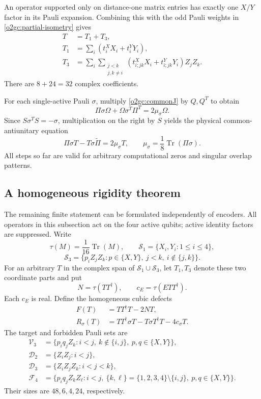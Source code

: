 \documentclass[11pt]{article}
\theoremstyle{definition}
\begin{document}
An operator supported only on distance-one matrix entries has exactly
one \(X/Y\) factor in its Pauli expansion. Combining this with the odd
Pauli weights in \eqref{o2gc:partial-isometry} gives
\begin{align}
 T&=T_1+T_3,\label{o2gc:T-support}\\
 T_1&=\sum_i(t_i^XX_i+t_i^YY_i),\nonumber\\
 T_3&=\sum_i\sum_{\substack{j<k\\j,k\ne i}}
          (t_{i;jk}^XX_i+t_{i;jk}^YY_i)Z_jZ_k.\nonumber
\end{align}
There are \(8+24=32\) complex coefficients.

For each single-active Pauli \(\sigma\), multiply
\eqref{o2gc:commonJ} by \(Q,Q^T\) to obtain
\[
 \Pi\sigma\Omega+\Omega\sigma^T\Pi^T=2\mu_\sigma\Omega.
\]
Since \(S\sigma^TS=-\sigma\), multiplication on the right by \(S\)
yields the physical common-antiunitary equation
\begin{equation}
 \Pi\sigma T-T\sigma\widetilde\Pi=2\mu_\sigma T,\qquad
 \mu_\sigma=\frac18\operatorname{Tr}(\Pi\sigma).
 \label{o2gc:physical-J}
\end{equation}
All steps so far are valid for arbitrary computational zeros and
singular overlap patterns.

\subsection{A homogeneous rigidity theorem}
\label{o2gc:subsec-rigidity}

The remaining finite statement can be formulated independently of
encoders. All operators in this subsection act on the four active
qubits; active identity factors are suppressed. Write
\[
 \tau(M)=\frac1{16}\operatorname{Tr}(M),\qquad
 \mathcal S_1=\{X_i,Y_i:1\le i\le4\},
\]
\[
 \mathcal S_3=\{p_iZ_jZ_k:p\in\{X,Y\},\ j<k,\ i\notin\{j,k\}\}.
\]
For an arbitrary \(T\) in the complex span of
\(\mathcal S_1\cup\mathcal S_3\), let \(T_1,T_3\) denote these two
coordinate parts and put
\begin{equation}
 N=\tau(TT^\dagger),\qquad c_E=\tau(ETT^\dagger).
 \label{o2gc:homogeneous-scalars}
\end{equation}
Each \(c_E\) is real. Define the homogeneous cubic defects
\begin{align}
 F(T)&=TT^\dagger T-2NT,\label{o2gc:defects}\\
 R_\sigma(T)&=TT^\dagger\sigma T-T\sigma T^\dagger T-4c_\sigma T.
 \nonumber
\end{align}
The target and forbidden Pauli sets are
\begin{align}
 \mathcal V_3&=\{p_iq_jZ_k:i<j,\ k\notin\{i,j\},\
                                  p,q\in\{X,Y\}\},\nonumber\\
 \mathcal D_2&=\{Z_iZ_j:i<j\},\nonumber\\
 \mathcal D_3&=\{Z_iZ_jZ_k:i<j<k\},\nonumber\\
 \mathcal F_4&=\{p_iq_jZ_kZ_\ell:i<j,\
                \{k,\ell\}=\{1,2,3,4\}\setminus\{i,j\},\
                p,q\in\{X,Y\}\}.
 \label{o2gc:Pauli-sets}
\end{align}
Their sizes are \(48,6,4,24\), respectively.
\end{document}
